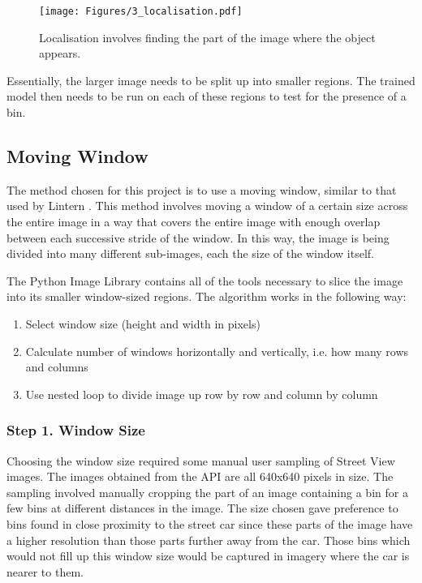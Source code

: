 \begin{figure}[H]
\centering
\texttt{[image: Figures/3\_localisation.pdf]}
\decoRule
\caption[Object Localisation]{Localisation involves finding the part of the image where the object appears.}
\label{fig:localisation}
\end{figure}

Essentially, the larger image needs to be split up into smaller regions. The trained model then needs to be run on each of these regions to test for the presence of a bin.

\subsection{Moving Window} \label{moving_window}
The method chosen for this project is to use a moving window, similar to that used by Lintern \parencite*{ref2.3}. This method involves moving a window of a certain size across the entire image in a way that covers the entire image with enough overlap between each successive stride of the window. In this way, the image is being divided into many different sub-images, each the size of the window itself.

The Python Image Library contains all of the tools necessary to slice the image into its smaller window-sized regions. The algorithm works in the following way:

\begin{enumerate}
    \item Select window size (height and width in pixels)
    \item Calculate number of windows horizontally and vertically, i.e. how many rows and columns
    \item Use nested loop to divide image up row by row and column by column
\end{enumerate}

\subsubsection{Step 1. Window Size}
Choosing the window size required some manual user sampling of Street View images. The images obtained from the API are all 640x640 pixels in size. The sampling involved manually cropping the part of an image containing a bin for a few bins at different distances in the image. The size chosen gave preference to bins found in close proximity to the street car since these parts of the image have a higher resolution than those parts further away from the car. Those bins which would not fill up this window size would be captured in imagery where the car is nearer to them.

